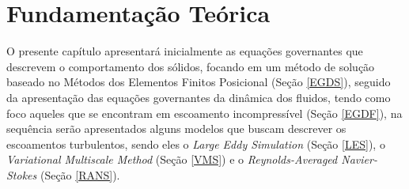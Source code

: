 \documentclass[_ArquivoPrincipal.tex]{subfiles}
\begin{document}
\chapter{Fundamentação Teórica} \label{FT}

O presente capítulo apresentará inicialmente as equações governantes que descrevem o comportamento dos sólidos, focando em um método de solução baseado no Métodos dos Elementos Finitos Posicional (Seção \ref{EGDS}), seguido da apresentação das equações governantes da dinâmica dos fluidos, tendo como foco aqueles que se encontram em escoamento incompressível (Seção \ref{EGDF}), na sequência serão apresentados alguns modelos que buscam descrever os escoamentos turbulentos, sendo eles o \textit{Large Eddy Simulation} (Seção \ref{LES}), o \textit{Variational Multiscale Method} (Seção \ref{VMS}) e o \textit{Reynolds-Averaged Navier-Stokes} (Seção \ref{RANS}).

%




\end{document}
